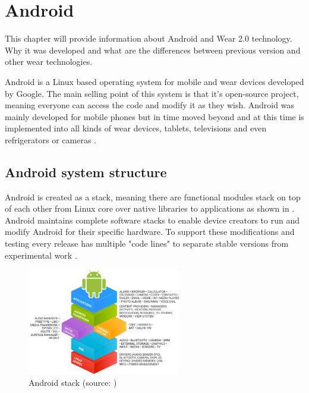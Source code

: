 \chapter{Android}\label{sec:Android}
This chapter will provide information about Android and Wear 2.0 technology. Why it was developed and what are the differences between previous version and other wear technologies.

\medskip

Android is a Linux based operating system for mobile and wear devices developed by Google. The main selling point of this system is that it's open-source project, meaning everyone can access the code and modify it as they wish. Android was mainly developed for mobile phones but in time moved beyond and at this time is implemented into all kinds of wear devices, tablets, televisions and even refrigerators or cameras \cite{WIGA}.

\section{Android system structure}\label{sec:AndroidSystemStructure}
Android is created as a stack, meaning there are functional modules stack on top of each other from Linux core over native libraries to applications as shown in . Android maintains complete software stacks to enable device creators to run and modify Android for their specific hardware. To support these modifications and testing every release has multiple "code lines" to separate stable versions from experimental work \cite{AOSP}.

\begin{figure}[H]
	\begin{centering}
		\includegraphics[width=0.6\textwidth]{img/android_stack}
		\par\end{centering}
	\caption{Android stack (source: \cite{AOSP})\label{fig:AndroidStack}}
	\label{fig6}
\end{figure}

